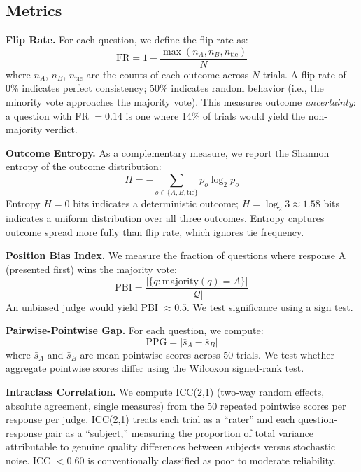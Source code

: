\documentclass{ijclclp}
\begin{document}
\subsection{Metrics}

\textbf{Flip Rate.} For each question, we define the flip rate as:
\begin{equation}
    \text{FR} = 1 - \frac{\max(n_A, n_B, n_{\text{tie}})}{N}
\end{equation}
where $n_A$, $n_B$, $n_{\text{tie}}$ are the counts of each outcome across $N$ trials. A flip rate of 0\% indicates perfect consistency; 50\% indicates random behavior (i.e., the minority vote approaches the majority vote). This measures outcome \textit{uncertainty}: a question with FR $= 0.14$ is one where 14\% of trials would yield the non-majority verdict.

\textbf{Outcome Entropy.} As a complementary measure, we report the Shannon entropy of the outcome distribution:
\begin{equation}
    H = -\sum_{o \in \{A, B, \text{tie}\}} p_o \log_2 p_o
\end{equation}
Entropy $H = 0$ bits indicates a deterministic outcome; $H = \log_2 3 \approx 1.58$ bits indicates a uniform distribution over all three outcomes. Entropy captures outcome spread more fully than flip rate, which ignores tie frequency.

\textbf{Position Bias Index.} We measure the fraction of questions where response A (presented first) wins the majority vote:
\begin{equation}
    \text{PBI} = \frac{|\{q : \text{majority}(q) = A\}|}{|\mathcal{Q}|}
\end{equation}
An unbiased judge would yield PBI $\approx 0.5$. We test significance using a sign test.

\textbf{Pairwise-Pointwise Gap.} For each question, we compute:
\begin{equation}
    \text{PPG} = |\bar{s}_A - \bar{s}_B|
\end{equation}
where $\bar{s}_A$ and $\bar{s}_B$ are mean pointwise scores across 50 trials. We test whether aggregate pointwise scores differ using the Wilcoxon signed-rank test.

\textbf{Intraclass Correlation.} We compute ICC(2,1) (two-way random effects, absolute agreement, single measures) from the 50 repeated pointwise scores per response per judge. ICC(2,1) treats each trial as a ``rater'' and each question-response pair as a ``subject,'' measuring the proportion of total variance attributable to genuine quality differences between subjects versus stochastic noise. ICC $< 0.60$ is conventionally classified as poor to moderate reliability.
\end{document}
